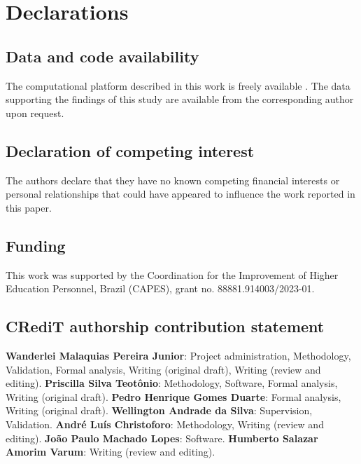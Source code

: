 \section*{Declarations}

\subsection*{Data and code availability}
The computational platform described in this work is freely available \parencite{ReliaBridge2026}. The data supporting the findings of this study are available from the corresponding author upon request.

\subsection*{Declaration of competing interest}
The authors declare that they have no known competing financial interests or personal relationships that could have appeared to influence the work reported in this paper.

\subsection*{Funding}
This work was supported by the Coordination for the Improvement of Higher Education Personnel, Brazil (CAPES), grant no. 88881.914003/2023-01.

\subsection*{CRediT authorship contribution statement}
\textbf{Wanderlei Malaquias Pereira Junior}: Project administration, Methodology, Validation, Formal analysis, Writing (original draft), Writing (review and editing).
\textbf{Priscilla Silva Teotônio}: Methodology, Software, Formal analysis, Writing (original draft).
\textbf{Pedro Henrique Gomes Duarte}: Formal analysis, Writing (original draft).
\textbf{Wellington Andrade da Silva}: Supervision, Validation.
\textbf{André Luís Christoforo}: Methodology, Writing (review and editing).
\textbf{João Paulo Machado Lopes}: Software.
\textbf{Humberto Salazar Amorim Varum}: Writing (review and editing).
